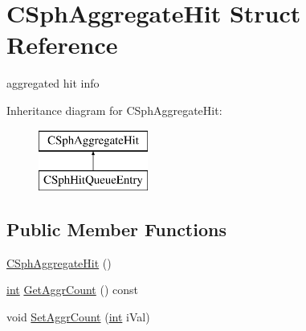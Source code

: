 \hypertarget{structCSphAggregateHit}{\section{C\-Sph\-Aggregate\-Hit Struct Reference}
\label{structCSphAggregateHit}
}


aggregated hit info  


Inheritance diagram for C\-Sph\-Aggregate\-Hit\-:\begin{figure}[H]
\begin{center}
\leavevmode
\includegraphics[height=2.000000cm]{structCSphAggregateHit}
\end{center}
\end{figure}
\subsection*{Public Member Functions}
\begin{DoxyCompactItemize}
\item 
\hyperlink{structCSphAggregateHit_aa75b488930250fa66e1275e3f09d3b7e}{C\-Sph\-Aggregate\-Hit} ()
\item 
\hyperlink{sphinxexpr_8cpp_a4a26e8f9cb8b736e0c4cbf4d16de985e}{int} \hyperlink{structCSphAggregateHit_a898f2bdaa81b577e99ccf48a7e0781f5}{Get\-Aggr\-Count} () const 
\item 
void \hyperlink{structCSphAggregateHit_a6f8ddaf5dbe4f7fc8ef2cf79436c467f}{Set\-Aggr\-Count} (\hyperlink{sphinxexpr_8cpp_a4a26e8f9cb8b736e0c4cbf4d16de985e}{int} i\-Val)
\end{DoxyCompactItemize}
